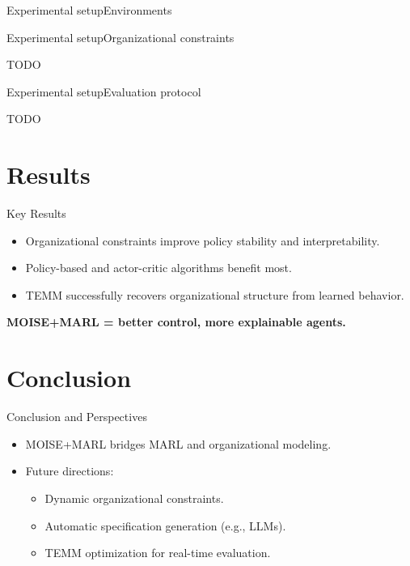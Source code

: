 \documentclass[9pt, aspectratio=169]{beamer}
\begin{document}
\begin{frame}{Experimental setup}{Environments}

  \begin{figure}
    \centering
  \end{figure}

\end{frame}

\begin{frame}{Experimental setup}{Organizational constraints}

  TODO

\end{frame}


\begin{frame}{Experimental setup}{Evaluation protocol}

  TODO

\end{frame}



\section{Results}

\begin{frame}{Key Results}
  \begin{itemize}
    \item Organizational constraints improve policy stability and interpretability.
    \item Policy-based and actor-critic algorithms benefit most.
    \item TEMM successfully recovers organizational structure from learned behavior.
  \end{itemize}
  \vspace{1em}
  \textbf{MOISE+MARL = better control, more explainable agents.}
\end{frame}

\section{Conclusion}


\begin{frame}{Conclusion and Perspectives}
  \begin{itemize}
    \item MOISE+MARL bridges MARL and organizational modeling.
    \item Future directions:
          \begin{itemize}
            \item Dynamic organizational constraints.
            \item Automatic specification generation (e.g., LLMs).
            \item TEMM optimization for real-time evaluation.
          \end{itemize}
  \end{itemize}
  \vspace{0.5em}
  \centering
\end{frame}


\appendix





\end{document}
